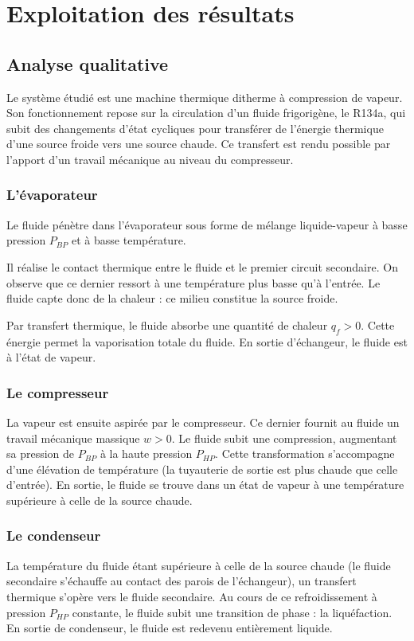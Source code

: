 \documentclass[a4paper,10pt,french]{scrartcl}
\begin{document}
\section{Exploitation des résultats}
\subsection{Analyse qualitative}
Le système étudié est une machine thermique ditherme à compression de vapeur. Son fonctionnement repose sur la circulation d'un fluide frigorigène, le R134a, qui subit des changements d'état cycliques pour transférer de l'énergie thermique d'une source froide vers une source chaude. 
Ce transfert est rendu possible par l'apport d'un travail mécanique au niveau du compresseur.
\subsubsection{L'évaporateur}
Le fluide pénètre dans l'évaporateur sous forme de mélange liquide-vapeur à basse pression $P_{BP}$ et à basse température. 

Il réalise le contact thermique entre le ﬂuide et le premier circuit
secondaire. On observe que ce dernier ressort à
une température plus basse qu’à l’entrée. Le ﬂuide capte donc de la chaleur : ce milieu
constitue la source froide.

Par transfert thermique, le fluide absorbe une quantité de chaleur $q_f > 0$. 
Cette énergie permet la vaporisation totale du fluide. 
En sortie d'échangeur, le fluide est à l'état de vapeur.

\subsubsection{Le compresseur}
La vapeur est ensuite aspirée par le compresseur. 
Ce dernier fournit au fluide un travail mécanique massique $w > 0$. 
Le fluide subit une compression, augmentant sa pression de $P_{BP}$ à la haute pression $P_{HP}$. 
Cette transformation s'accompagne d'une élévation de température (la tuyauterie de sortie est plus chaude que celle d'entrée). 
En sortie, le fluide se trouve dans un état de vapeur à une température supérieure à celle de la source chaude.

\subsubsection{Le condenseur}
La température du fluide étant supérieure à celle de la source chaude (le fluide secondaire s'échauffe au contact des parois de l'échangeur), un transfert thermique s'opère vers le fluide secondaire. 
Au cours de ce refroidissement à pression $P_{HP}$ constante, le fluide subit une transition de phase : 
la liquéfaction. En sortie de condenseur, le fluide est redevenu entièrement liquide. 
\end{document}
